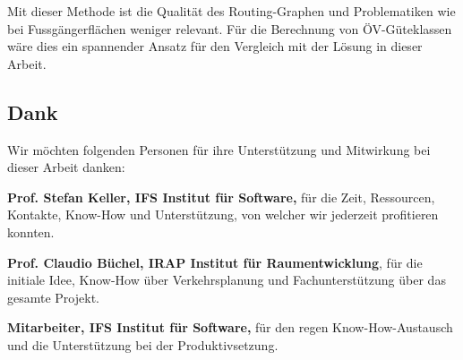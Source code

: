 Mit dieser Methode ist die Qualität des Routing-Graphen und Problematiken wie bei Fussgängerflächen weniger relevant.
Für die Berechnung von \acs{ÖV}-Güteklassen wäre dies ein spannender Ansatz für den Vergleich mit der Lösung in dieser Arbeit.

\subsection{Dank}
\label{Resultate:Dank}

Wir möchten folgenden Personen für ihre Unterstützung und Mitwirkung bei dieser Arbeit danken:

\textbf{Prof. Stefan Keller, IFS Institut für Software,} für die Zeit, Ressourcen, Kontakte, Know-How und Unterstützung, von welcher wir jederzeit profitieren konnten.

\textbf{Prof. Claudio Büchel, IRAP Institut für Raumentwicklung}, für die initiale Idee, Know-How über Verkehrsplanung und Fachunterstützung über das gesamte Projekt.

\textbf{Mitarbeiter, IFS Institut für Software,} für den regen Know-How-Austausch und die Unterstützung bei der Produktivsetzung.
